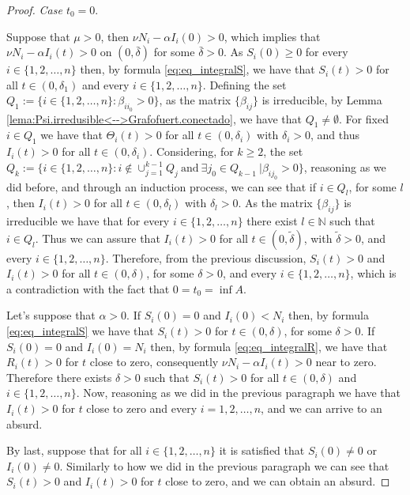 \documentclass[a4paper,10pt]{article}
\theoremstyle{remark}
\begin{document}
\begin{proof}
\emph{Case $t_0=0.$}


Suppose that $\mu>0$, then $\nu N_i-\alpha I_i(0)>0$, which implies that $\nu N_i-\alpha I_i(t)>0$ on $(0,\bar{\delta})$ for some $\bar{\delta}>0$. As $S_i(0)\geq 0$ for every $i\in\{1,2,\ldots,n\}$ then, by formula \eqref{eq:eq_integralS}, we have that  $S_i(t)>0$ for all $t\in (0,\delta_1)$ and every $i\in\{1,2,\ldots,n\}$.  Defining the set $Q_1:=\{i\in\{1,2,\ldots,n\}:\beta_{i i_0}>0\}$, as the matrix  $\{\beta_{ij}\}$ is  irreducible, by Lemma \ref{lema:Psi.irredusible<-->Grafofuert.conectado}, we have that $Q_1\neq \emptyset$. For fixed $i\in Q_1$ we have that $\Theta_i(t)>0$ for all $t\in (0,\delta_i)$ with $\delta_i>0$, and thus $I_i(t)>0$ for all $t\in (0,\delta_i)$.  Considering, for $k\geq 2$, the set $Q_k:=\{i\in \{1,2,\ldots,n\}: i\notin \cup_{j=1}^{k-1}Q_j\ \text{and}\ \exists j_0\in Q_{k-1}\ | \beta_{ij_0}>0 \}$, reasoning as we did before, and through an induction process, we can see that if  $i\in Q_l$, for some $l$, then $I_i(t)>0$  for all $t\in (0,\delta_l)$ with $\delta_l>0$. As the matrix $\{\beta_{ij}\}$ is irreducible we have that for every $i\in \{1,2,\ldots,n\}$ there exist $l\in\mathbb{N}$ such that $i\in Q_l$. Thus we can assure that $I_i(t)>0$ for all $t\in (0,\tilde{\delta})$, with $\tilde{\delta}>0$, and every $i\in \{1,2,\ldots,n\}$. Therefore, from the previous discussion,   $S_i(t)>0$ and $I_i(t)>0$ for all $t\in (0,\delta)$, for some $\delta>0$, and every $i\in \{1,2,\ldots,n\}$, which is a contradiction with the fact that $0=t_0=\inf A$.

Let's suppose that $\alpha>0$. If $S_i(0)=0$ and $I_i(0)<N_i$ then, by formula \eqref{eq:eq_integralS} we have that $S_i(t)>0$ for $t\in (0,\delta)$, for some $\delta>0$.  If  $S_{i}(0)=0$ and $I_{i}(0)=N_i$ then, by formula \eqref{eq:eq_integralR}, we have that $R_i(t)>0$ for $t$ close to zero, consequently $\nu N_i-\alpha I_i(t)>0$ near to zero.  Therefore there exists $\delta>0$ such that $S_i(t)>0$ for all $t\in (0,\delta)$ and $i\in\{1,2,\ldots,n\}$. Now, reasoning as we did in the previous paragraph we have that $I_i(t)>0$ for $t$ close to zero and every $i=1,2,\ldots,n$, and we can arrive to an absurd.  

By last, suppose that for all $i\in\{1,2,\ldots,n\}$ it is satisfied that $S_i(0)\neq 0$ or $I_i(0)\neq 0$. Similarly to how we did in the previous paragraph we can see that $S_i(t)>0$ and $I_i(t)>0$ for $t$ close to zero, and we can obtain an absurd.



  




\end{proof}
\end{document}

